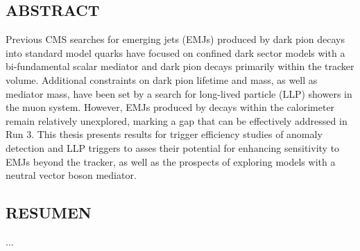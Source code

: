 



\vspace*{0.5in}
\begin{center}
	\section*{ABSTRACT}
\end{center}

\noindent
Previous CMS searches for emerging jets (EMJs) produced by dark pion decays into standard model quarks have focused on confined dark sector models with a bi-fundamental scalar mediator and dark pion decays primarily within the tracker volume. Additional constraints on dark pion lifetime and mass, as well as mediator mass, have been set by a search for long-lived particle (LLP) showers in the muon system. However, EMJs produced by decays within the calorimeter remain relatively unexplored, marking a gap that can be effectively addressed in Run 3. This thesis presents results for trigger efficiency studies of anomaly detection and LLP triggers to asses their potential for enhancing sensitivity to EMJs beyond the tracker, as well as the prospects of exploring models with a neutral vector boson mediator.







\newpage





\vspace*{0.5in}
\begin{center}
	\section*{RESUMEN}
\end{center}

\noindent
...

